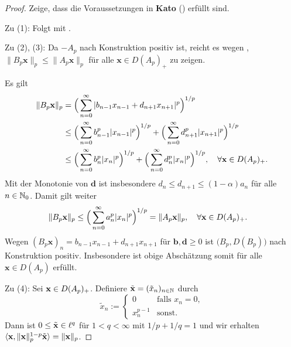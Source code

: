 \begin{proof}
\par
Zeige, dass die Voraussetzungen in \textbf{Kato} () erfüllt sind. 
\par
Zu (1): Folgt mit .

\par
Zu (2), (3): Da $-A_p$ nach Konstruktion positiv ist, reicht es wegen , $\|B_p\textbf{x}\|_p\leq\|A_p\textbf{x}\|_p$ für alle  $\textbf{x}\in D(A_p)_+$ zu zeigen. \par Es gilt
\begin{align*}
\|B_p\textnormal{\textbf{x}}\|_p
&= \Big(\sum_{n=0}^\infty |b_{n-1}x_{n-1} + d_{n+1}x_{n+1}|^p\Big)^{1/p}\\
&\leq \Big(\sum_{n=0}^\infty b_{n-1}^p |x_{n-1}|^p\Big)^{1/p} + \Big(\sum_{n=0}^\infty d_{n+1}^p |x_{n+1}|^p\Big)^{1/p}\\
&\leq \Big(\sum_{n=0}^\infty b_n^p|x_n|^p\Big)^{1/p} + \Big(\sum_{n=0}^\infty d_n^p |x_n|^p\Big)^{1/p},\quad \forall \textbf{x}\in D(A_p)_+.
\end{align*}
Mit der Monotonie von $\textbf{d}$ ist insbesondere $d_{n}\leq d_{n+1}\leq (1-\alpha)a_n$ für alle $n\in\mathbb{N}_0$. Damit gilt weiter
\begin{align*}
\|B_p\textnormal{\textbf{x}}\|_p
&\leq \Big(\sum_{n=0}^\infty a_n^p |x_n|^p\Big)^{1/p}= \|A_p \textnormal{\textbf{x}}\|_p,\quad \forall \textbf{x}\in D(A_p)_+.
\end{align*}
Wegen $(B_p\textbf{x})_n=b_{n-1}x_{n-1}+d_{n+1}x_{n+1}$ für $\textbf{b},\textbf{d}\geq0$ ist $\big(B_p, D(B_p)\big)$ nach Konstruktion positiv. Insbesondere ist obige Abschätzung somit für alle $\textbf{x}\in D(A_p)$ erfüllt.

Zu (4): 
Sei $\textnormal{\textbf{x}}\in D(A_p)_+$. Definiere $\tilde{\textnormal{\textbf{x}}} = (\tilde x_n)_{n\in\mathbb{N}}$ durch
\begin{equation*}
\tilde x_n:= 
\begin{cases}
0\quad&\text{falls }x_n=0,\\
x_n^{p-1}&\text{sonst.}
\end{cases}
\end{equation*}
Dann ist $0\leq \tilde{\textnormal{\textbf{x}}}\in \ell^q$ für $1<q<\infty$ mit $1/p + 1/q=1$ und wir erhalten
$\langle \textbf{x},\|\textbf{x}\|_p^{1-p}\tilde{\textnormal{\textbf{x}}}\rangle =\|\textbf{x}\|_p$. 


\end{proof}
